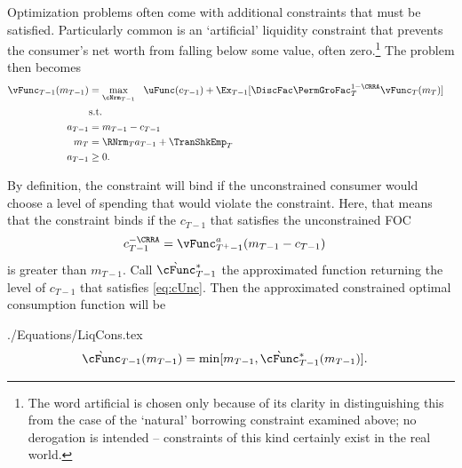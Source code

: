 \documentclass[titlepage, headings=optiontotocandhead]{\econtex}
\begin{document}
Optimization problems often come with additional constraints that must
be satisfied.  Particularly common is an `artificial' liquidity constraint that
prevents the consumer's net worth from falling below some value, often
zero.\footnote{The word artificial is chosen only because of its clarity in distinguishing
  this from the case of the `natural' borrowing constraint examined above; no derogation is
  intended -- constraints of this kind certainly exist in the real world.}  The problem then becomes
\begin{equation*}\begin{gathered}\begin{aligned}
      {\vFunc}_{T-1}({m}_{T-1})  & = \max_{\cNrm_{T-1}} ~~ \uFunc({c}_{T-1}) + \Ex_{T-1} [\DiscFac \PermGroFac_{T}^{1-\CRRA}{\vFunc}_{T}({m}_{T})] \label{eq:ConstrArt}
      \\ & \mbox{s.t.}&  \nonumber
      \\ {a}_{T-1}  & = {m}_{T-1} - {c}_{T-1}
      \\ {m}_{T}  & = \RNrm_{T} {a}_{T-1} + \TranShkEmp_{T}
      \\ {a}_{T-1} & \geq 0 .
    \end{aligned}\end{gathered}\end{equation*}


By definition, the constraint will bind if the unconstrained consumer
would choose a level of spending that would violate the constraint.
Here, that means that the constraint binds if the ${c}_{T-1}$
that satisfies the unconstrained FOC
\begin{equation}\begin{gathered}\begin{aligned}
      {c}_{T-1}^{-\CRRA}  & = \vFunc^{{a}}_{T^{+}-1}({m}_{T-1}-{c}_{T-1}) \label{eq:cUnc}
    \end{aligned}\end{gathered}\end{equation}
is greater than ${m}_{T-1}$.  Call $\grave{\cFunc}^{\ast}_{T-1}$ the approximated function
returning the level of ${c}_{T-1}$ that satisfies \eqref{eq:cUnc}.
Then the approximated constrained optimal consumption function will be
\begin{verbatimwrite}{./Equations/LiqCons.tex}
  \begin{equation}\begin{gathered}\begin{aligned}
        \grave{\cFunc}_{T-1}({m}_{T-1})  & = \min[{m}_{T-1},\grave{\cFunc}^{\ast}_{T-1}({m}_{T-1})] \label{eq:LiqCons}.
      \end{aligned}\end{gathered}\end{equation}
\end{verbatimwrite}
\unskip
\end{document}
